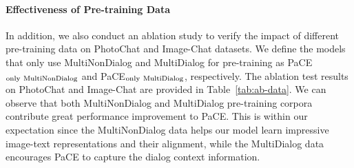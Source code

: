 \documentclass[11pt]{article}
\begin{document}
\paragraph{Effectiveness of Pre-training Data}
In addition, we also conduct an ablation study to verify the impact of different pre-training data on PhotoChat and Image-Chat datasets. We define the models that only use MultiNonDialog and MultiDialog for pre-training as PaCE$_{\rm only~\rm MultiNonDialog}$ and PaCE$_{\rm only~\rm MultiDialog}$, respectively. The ablation test results on PhotoChat and Image-Chat are provided in Table~\ref{tab:ab-data}. We can observe that both MultiNonDialog and MultiDialog pre-training corpora contribute great performance improvement to PaCE. This is within our expectation since the MultiNonDialog data helps our model learn impressive image-text representations and their alignment, while the MultiDialog data encourages PaCE to capture the dialog context information.
\begin{table}[h]
    \centering
    \caption{
     Ablation test results on the multi-modal dialog retrieval task by using different pre-training objectives. 
    }
    \label{tab:ab-stage1}
\end{table}
\end{document}
